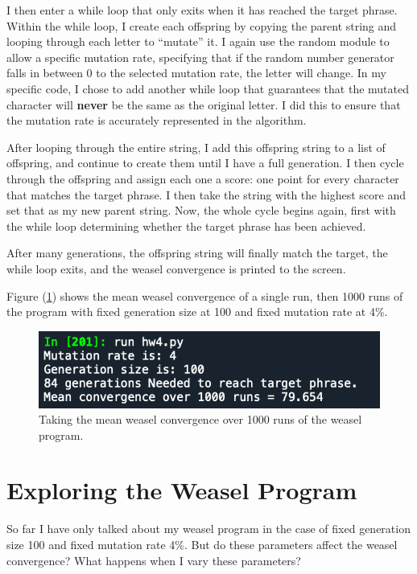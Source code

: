 \documentclass[12pt, letterpaper]{article}
\begin{document}
I then enter a while loop that only exits when it has reached the target phrase. Within the while loop, I create each offspring by copying the parent string and looping through each letter to ``mutate'' it. I again use the random module to allow a specific mutation rate, specifying that if the random number generator falls in between 0 to the selected mutation rate, the letter will change. In my specific code, I chose to add another while loop that guarantees that the mutated character will \textbf{never} be the same as the original letter. I did this to ensure that the mutation rate is accurately represented in the algorithm.

After looping through the entire string, I add this offspring string to a list of offspring, and continue to create them until I have a full generation. I then cycle through the offspring and assign each one a score: one point for every character that matches the target phrase. I then take the string with the highest score and set that as my new parent string. Now, the whole cycle begins again, first with the while loop determining whether the target phrase has been achieved.

After many generations, the offspring string will finally match the target, the while loop exits, and the weasel convergence is printed to the screen.

Figure (\ref{fig:mean1000}) shows the mean weasel convergence of a single run, then 1000 runs of the program with fixed generation size at 100 and fixed mutation rate at 4\%.

\begin{figure}[!ht]
  \centering
  \includegraphics[width=12cm]{mean_1000_runs.png}
  \caption{Taking the mean weasel convergence over 1000 runs of the weasel program.}
  \label{fig:mean1000}
\end{figure}



\section{Exploring the Weasel Program}

So far I have only talked about my weasel program in the case of fixed generation size 100 and fixed mutation rate 4\%. But do these parameters affect the weasel convergence? What happens when I vary these parameters?
\end{document}
